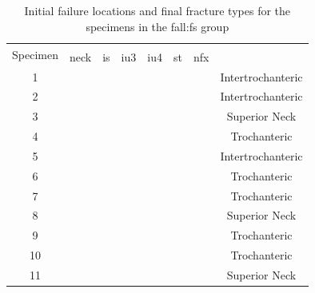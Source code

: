 \begin{table}
	\begin{center}
		\caption[Failure locations and fracture types for simulated group]{Initial failure locations and final fracture types for the specimens in the fall:\ac{fs} group} %
		\label{tab:GilchristFractures}
		\begin{tabular}{|c||>{\centering}p{2em}|>{\centering}p{2em}|>{\centering}p{2em}|>{\centering}p{2em}|>{\centering}p{2em}|>{\centering}p{2em}|c|}
			\hline 
			\multirow{2}{*}{Specimen}	& \multicolumn{6}{c|}{Fracture Types}	 & \multirow{2}{*}{\lbCell{Initial Failure \\ Location}} \\ \cline{2-7}
		 & \ac{neck} & \ac{is} & \ac{iu3} & \ac{iu4} & \ac{st} & \ac{nfx} & \\ \hline
			\hline 1 		& \checkmark &  & & \checkmark & & 	& Intertrochanteric \\
			
			\hline 2 		&  & \checkmark &  &  &  & 			& Intertrochanteric \\
			
			\hline 3 		&  &  &  &  &  & \checkmark			& Superior Neck		\\
			
			\hline 4 		& \checkmark &  & \checkmark &  & \checkmark & 	& Trochanteric 		\\ 
			
			\hline 5 		&  &  & \checkmark &  &  & 			& Intertrochanteric \\ 
			
			\hline 6 		& \checkmark &  & \checkmark &  &  &  	& Trochanteric		\\ 
			
			\hline 7 		&  &  & \checkmark &  &  & 			& Trochanteric		\\ 
			
			\hline 8 		& \checkmark &  &  &  &  & 			& Superior Neck		\\ 
			
			\hline 9 		&  &  &  & \checkmark &  & 			& Trochanteric		\\ 
			
			\hline 10 		& \checkmark &  &  & \checkmark &  & & Trochanteric		\\
			
			\hline 11 		& \checkmark &  &  &  &  &			& Superior Neck		\\ 
			

\end{tabular}
\end{center}
\end{table}
